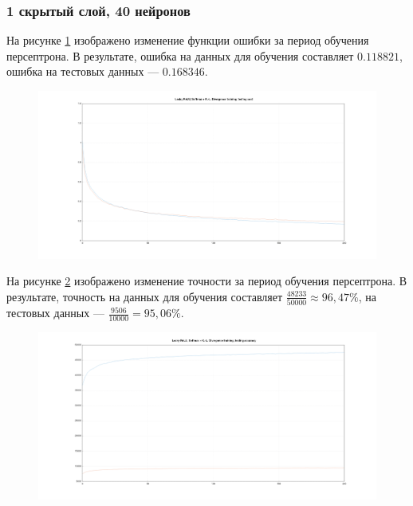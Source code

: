 \documentclass[a4paper, 14pt]{extarticle}
\begin{document}
\subsubsection{1 скрытый слой, 40 нейронов}


На рисунке \ref{fig:1_40_leaky_relu_softmax_kl_divergence_cost} изображено изменение функции ошибки за период обучения персептрона.
В результате, ошибка на данных для обучения составляет $0.118821$, ошибка на тестовых данных --- $0.168346$.

\begin{figure}[!htb]
  \centering\includegraphics[width=\textwidth]{images/1_40_leaky_relu_softmax_kl_divergence_cost.png}
  \caption{}
  \label{fig:1_40_leaky_relu_softmax_kl_divergence_cost}
\end{figure}

На рисунке \ref{fig:1_40_leaky_relu_softmax_kl_divergence_accuracy} изображено изменение точности за период обучения персептрона.
В результате, точность на данных для обучения составляет $\frac{48233}{50000} \approx 96,47\%$, на тестовых данных --- $\frac{9506}{10000} = 95,06\%$.

\begin{figure}[!htb]
  \centering\includegraphics[width=\textwidth]{images/1_40_leaky_relu_softmax_kl_divergence_accuracy.png}
  \caption{}
  \label{fig:1_40_leaky_relu_softmax_kl_divergence_accuracy}
\end{figure}
\end{document}
